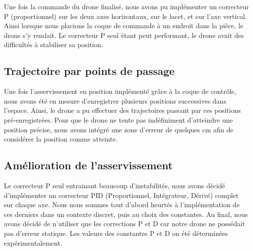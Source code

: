            Une fois la commande du drone finalisé, nous avons pu implémenter un correcteur P (proportionnel) sur les deux axes horizontaux, sur le lacet, et sur l'axe vertical. Ainsi lorsque nous placions la coque de commande à un endroit dans la pièce, le drone s'y rendait. Le correcteur P seul étant peut performant, le drone avait des difficultés à stabiliser sa position.

        \subsection{Trajectoire par points de passage}
Une fois l'asservissement en position implémenté grâce à la coque de contrôle, nous avons été en mesure d'enregistrer plusieurs positions successives dans l'espace. Ainsi, le drone a pu effectuer des trajectoires passant par ces positions pré-enregistrées. Pour que le drone ne tente pas indéfiniment d'atteindre une position précise, nous avons intégré une zone d'erreur de quelques cm afin de considérer la position comme atteinte.

        \subsection{Amélioration de l'asservissement}
Le correcteur P seul entrainant beaucoup d'instabilités, nous avons décidé d'implémenter un correcteur PID (Proportionnel, Intégrateur, Dérivé) complet sur chaque axe. Nous nous sommes tout d'abord heurtés à l'implémentation de ces derniers dans un contexte discret, puis au choix des constantes. Au final, nous avons décidé de n'utiliser que les corrections P et D car notre drone ne possédait pas d'erreur statique. Les valeurs des constantes P et D on été déterminées expérimentalement.
